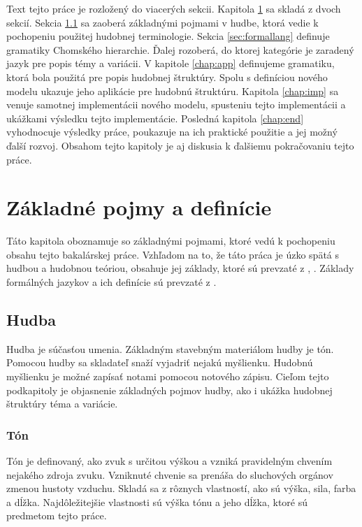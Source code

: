 Text tejto práce je rozložený do viacerých sekcii. Kapitola \ref{chap:definitions} sa skladá z dvoch sekcií. Sekcia \ref{sec:music} sa zaoberá základnými pojmami v hudbe, ktorá vedie k pochopeniu použitej hudobnej terminologie. Sekcia \ref{sec:formallang} definuje gramatiky Chomského hierarchie. Ďalej rozoberá, do ktorej kategórie je zaradený jazyk pre popis témy a variácii. V kapitole \ref{chap:app} definujeme gramatiku, ktorá bola použitá pre popis hudobnej štruktúry. Spolu s definíciou nového modelu ukazuje jeho aplikácie pre hudobnú štruktúru. Kapitola \ref{chap:imp} sa venuje samotnej implementácii nového modelu, spusteniu tejto implementácii a ukážkami výsledku tejto implementácie. Posledná kapitola \ref{chap:end} vyhodnocuje výsledky práce, poukazuje na ich praktické použitie a jej možný ďalší rozvoj. Obsahom tejto kapitoly je aj diskusia k ďalšiemu pokračovaniu tejto práce. 


\chapter{Základné pojmy a definície}
\label{chap:definitions}
Táto kapitola oboznamuje so základnými pojmami, ktoré vedú k pochopeniu obsahu tejto bakalárskej práce. Vzhľadom na to, že táto práca je úzko spätá s hudbou a hudobnou teóriou, obsahuje jej základy, ktoré sú prevzaté z \cite{MUSICTHEORY}, \cite{DunnettVar}. Základy formálných jazykov a ich definície sú prevzaté z \cite{MEDUNATHEORY}.

\section{Hudba}
\label{sec:music}
Hudba je súčasťou umenia. Základným stavebným materiálom hudby je tón. Pomocou hudby sa skladateľ snaží vyjadriť nejakú myšlienku. Hudobnú myšlienku je možné zapísať notami pomocou notového zápisu. Cieľom tejto podkapitoly je objasnenie základných pojmov hudby, ako i ukážka hudobnej štruktúry téma a variácie.

\subsection{Tón}
Tón je definovaný, ako zvuk s určitou výškou a vzniká pravidelným chvením nejakého zdroja zvuku. Vzniknuté chvenie sa prenáša do sluchových orgánov zmenou hustoty vzduchu. Skladá sa z rôznych vlastností, ako sú výška, sila, farba a dĺžka. Najdôležitejšie vlastnosti sú výška tónu a jeho dĺžka, ktoré sú predmetom tejto práce.

